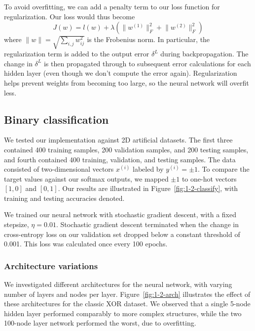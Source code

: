 \documentclass{article}
\newcommand{\sind}[1]{^{(#1)}}
\begin{document}
\begin{multicols}{2}
To avoid overfitting, we can add a penalty term to our loss function for regularization.
Our loss would thus become
\begin{equation}
    J(w) = l(w) +
      \lambda(\lVert w^{(1)} \rVert^2_F + \lVert w^{(2)} \rVert^2_F)
\end{equation}
where $\lVert w\rVert = \sqrt{\sum_{i,j}{w_{ij}^2}}$ is the Frobenius norm.
In particular, the regularization term is added to the output error $\delta^L$
during backpropagation. The change in $\delta^L$ is then propagated
through to subsequent error calculations for each hidden layer
(even though we don't compute the error again).
Regularization helps prevent weights from becoming too large,
so the neural network will overfit less.

\subsection{Binary classification}
\label{subsubsec:binary}

We tested our implementation against 2D artificial datasets.
The first three contained 400 training samples,
200 validation samples,
and 200 testing samples, and fourth contained 
400 training, validation, and testing samples.
The data consisted of two-dimensional vectors $x\sind{i}$
labeled by $y\sind{i} = \pm1$.
To compare the target values against our softmax outputs,
we mapped $\pm1$ to one-hot vectors $[1,0]$ and $[0,1]$.
Our results are illustrated in Figure~\ref{fig:1-2-classify},
with training and testing accuracies denoted.

We trained our neural network with stochastic gradient descent, with a 
fixed stepsize, $\eta = 0.01$. Stochastic gradient descent terminated when
the change in cross-entropy loss on our validation set dropped below a constant threshold of 0.001.
This loss was calculated once every 100 epochs.

\subsubsection{Architecture variations}
\label{subsubsubsec:binaryarch}
We investigated different architectures for the neural network,
with varying number of layers and nodes per layer.
Figure~\ref{fig:1-2-arch} illustrates the effect of these architectures for the classic XOR dataset.
We observed that a single 5-node hidden layer performed comparably to more complex structures,
while the two 100-node layer network performed the worst, due to overfitting.


\end{multicols}
\end{document}
